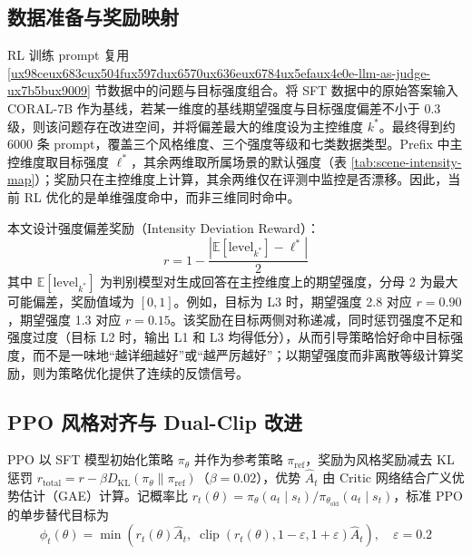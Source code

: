 \documentclass[fontset=fandol,type=master,campus=shenzhen,etitleauto=true]{hithesisbook}
\begin{document}
\subsection{数据准备与奖励映射}\label{ux6570ux636eux51c6ux5907ux4e0eux5956ux52b1ux6620ux5c04}

RL 训练 prompt 复用 \ref{ux98ceux683cux504fux597dux6570ux636eux6784ux5efaux4e0e-llm-as-judge-ux7b5bux9009} 节数据中的问题与目标强度组合。将 SFT 数据中的原始答案输入 CORAL-7B 作为基线，若某一维度的基线期望强度与目标强度偏差不小于 0.3 级，则该问题存在改进空间，并将偏差最大的维度设为主控维度 $k^*$。最终得到约 6000 条 prompt，覆盖三个风格维度、三个强度等级和七类数据类型。Prefix 中主控维度取目标强度 $\ell^*$，其余两维取所属场景的默认强度（表 \ref{tab:scene-intensity-map}）；奖励只在主控维度上计算，其余两维仅在评测中监控是否漂移。因此，当前 RL 优化的是单维强度命中，而非三维同时命中。

本文设计强度偏差奖励（Intensity Deviation Reward）：
\begin{equation}
r = 1 - \frac{\left|\mathbb{E}[\text{level}_{k^*}] - \ell^*\right|}{2}
\end{equation}
其中 $\mathbb{E}[\text{level}_{k^*}]$ 为判别模型对生成回答在主控维度上的期望强度，分母 2 为最大可能偏差，奖励值域为 $[0,1]$。例如，目标为 L3 时，期望强度 2.8 对应 $r = 0.90$，期望强度 1.3 对应 $r = 0.15$。该奖励在目标两侧对称递减，同时惩罚强度不足和强度过度（目标 L2 时，输出 L1 和 L3 均得低分），从而引导策略恰好命中目标强度，而不是一味地“越详细越好”或“越严厉越好”；以期望强度而非离散等级计算奖励，则为策略优化提供了连续的反馈信号。

\subsection{PPO 风格对齐与 Dual-Clip 改进}\label{ppo-ux98ceux683cux5bf9ux9f50ux4e0e-dual-clip-ux6539ux8fdb}

PPO\cite{ref33} 以 SFT 模型初始化策略 $\pi_\theta$ 并作为参考策略 $\pi_{\text{ref}}$，奖励为风格奖励减去 KL 惩罚 $r_{\text{total}} = r - \beta D_{\text{KL}}(\pi_\theta \parallel \pi_{\text{ref}})$（$\beta = 0.02$），优势 $\hat{A}_t$ 由 Critic 网络结合广义优势估计（GAE）计算。记概率比 $r_t(\theta) = \pi_\theta(a_t \mid s_t) / \pi_{\theta_{\text{old}}}(a_t \mid s_t)$，标准 PPO 的单步替代目标为
\begin{equation}
\phi_t(\theta) = \min\left( r_t(\theta) \hat{A}_t,\; \operatorname{clip}(r_t(\theta), 1-\varepsilon, 1+\varepsilon) \hat{A}_t \right), \quad \varepsilon = 0.2
\end{equation}
\end{document}
